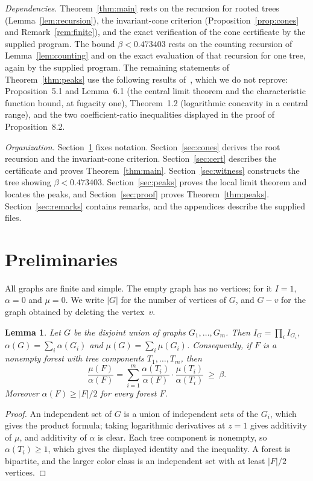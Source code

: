 \documentclass{amsart}
\numberwithin{equation}{section}
\theoremstyle{plain}
\newtheorem{lemma}[theorem]{Lemma}
\theoremstyle{definition}
\theoremstyle{remark}
\begin{document}
\medskip
\noindent\emph{Dependencies.} Theorem~\ref{thm:main} rests on the recursion for rooted trees (Lemma~\ref{lem:recursion}), the invariant-cone criterion (Proposition~\ref{prop:cones} and Remark~\ref{rem:finite}), and the exact verification of the cone certificate by the supplied program. The bound $\beta<0.473403$ rests on the counting recursion of Lemma~\ref{lem:counting} and on the exact evaluation of that recursion for one tree, again by the supplied program. The remaining statements of Theorem~\ref{thm:peaks} use the following results of~\cite{FLNYZ}, which we do not reprove: Proposition~5.1 and Lemma~6.1 (the central limit theorem and the characteristic function bound, at fugacity one), Theorem~1.2 (logarithmic concavity in a central range), and the two coefficient-ratio inequalities displayed in the proof of Proposition~8.2.

\medskip
\noindent\emph{Organization.} Section~\ref{sec:prelim} fixes notation. Section~\ref{sec:cones} derives the root recursion and the invariant-cone criterion. Section~\ref{sec:cert} describes the certificate and proves Theorem~\ref{thm:main}. Section~\ref{sec:witness} constructs the tree showing $\beta<0.473403$. Section~\ref{sec:peaks} proves the local limit theorem and locates the peaks, and Section~\ref{sec:proof} proves Theorem~\ref{thm:peaks}. Section~\ref{sec:remarks} contains remarks, and the appendices describe the supplied files.

\section{Preliminaries}\label{sec:prelim}

All graphs are finite and simple. The empty graph has no vertices; for it $I=1$, $\alpha=0$ and $\mu=0$. We write $|G|$ for the number of vertices of $G$, and $G-v$ for the graph obtained by deleting the vertex~$v$.

\begin{lemma}\label{lem:additive}
Let $G$ be the disjoint union of graphs $G_1,\dots,G_m$. Then $I_G=\prod_iI_{G_i}$, $\alpha(G)=\sum_i\alpha(G_i)$ and $\mu(G)=\sum_i\mu(G_i)$. Consequently, if $F$ is a nonempty forest with tree components $T_1,\dots,T_m$, then
\[
\frac{\mu(F)}{\alpha(F)}=\sum_{i=1}^m\frac{\alpha(T_i)}{\alpha(F)}\cdot\frac{\mu(T_i)}{\alpha(T_i)}\ \ge\ \beta .
\]
Moreover $\alpha(F)\ge|F|/2$ for every forest $F$.
\end{lemma}

\begin{proof}
An independent set of $G$ is a union of independent sets of the $G_i$, which gives the product formula; taking logarithmic derivatives at $z=1$ gives additivity of $\mu$, and additivity of $\alpha$ is clear. Each tree component is nonempty, so $\alpha(T_i)\ge1$, which gives the displayed identity and the inequality. A forest is bipartite, and the larger color class is an independent set with at least $|F|/2$ vertices.
\end{proof}
\end{document}
